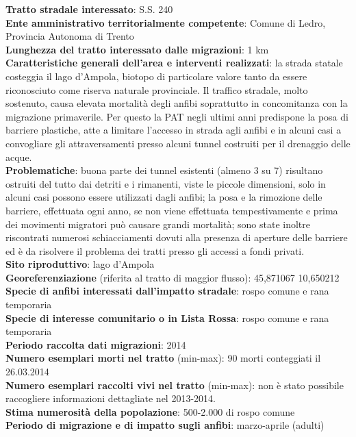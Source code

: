 \documentclass[11pt,a4paper,twoside]{memoir}
\begin{document}
\textbf{Tratto stradale interessato}: S.S. 240 \\
\textbf{Ente amministrativo territorialmente competente}: Comune di Ledro, Provincia Autonoma di Trento \\
\textbf{Lunghezza del tratto interessato dalle migrazioni}: 1 km \\
\textbf{Caratteristiche generali dell’area e interventi realizzati}: la strada statale costeggia il lago d'Ampola, biotopo di particolare valore tanto da essere riconosciuto come riserva naturale provinciale. Il traffico stradale, molto sostenuto, causa elevata mortalità degli anfibi soprattutto in concomitanza con la migrazione primaverile. Per questo la PAT negli ultimi anni predispone la posa di barriere plastiche, atte a limitare l'accesso in strada agli anfibi e in alcuni casi a convogliare gli attraversamenti presso alcuni tunnel costruiti per il drenaggio delle acque. \\
\textbf{Problematiche}: buona parte dei tunnel esistenti (almeno 3 su 7) risultano ostruiti del tutto dai detriti e i rimanenti, viste le piccole dimensioni, solo in alcuni casi possono essere utilizzati dagli anfibi; la posa e la rimozione delle barriere, effettuata ogni anno, se non viene effettuata tempestivamente e prima dei movimenti migratori può causare grandi mortalità; sono state inoltre riscontrati numerosi schiacciamenti dovuti alla presenza di aperture delle barriere ed è da risolvere il problema dei tratti presso gli accessi a fondi privati. \\
\textbf{Sito riproduttivo}: lago d'Ampola \\
\textbf{Georeferenziazione} (riferita al tratto di maggior flusso): 45,871067 10,650212 \\
\textbf{Specie di anfibi interessati dall’impatto stradale}: rospo comune e rana temporaria \\
\textbf{Specie di interesse comunitario o in Lista Rossa}: rospo comune e rana temporaria \\
\textbf{Periodo raccolta dati migrazioni}: 2014 \\
\textbf{Numero esemplari morti nel tratto} (min-max): 90 morti conteggiati il 26.03.2014 \\
\textbf{Numero esemplari raccolti vivi nel tratto} (min-max): non è stato possibile raccogliere informazioni dettagliate nel 2013-2014. \\
\textbf{Stima numerosità della popolazione}: 500-2.000 di rospo comune \\
\textbf{Periodo di migrazione e di impatto sugli anfibi}: marzo-aprile (adulti) \\
\end{document}
